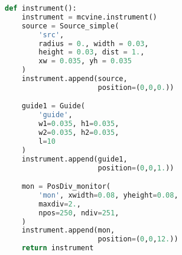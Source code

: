 \begin{lstlisting}[language=python]
def instrument():
    instrument = mcvine.instrument()
    source = Source_simple(
        'src',
        radius = 0., width = 0.03,
        height = 0.03, dist = 1.,
        xw = 0.035, yh = 0.035
    )
    instrument.append(source,
                      position=(0,0,0.))

    guide1 = Guide(
        'guide',
        w1=0.035, h1=0.035,
        w2=0.035, h2=0.035,
        l=10
    )
    instrument.append(guide1,
                      position=(0,0,1.))

    mon = PosDiv_monitor(
        'mon', xwidth=0.08, yheight=0.08,
        maxdiv=2.,
        npos=250, ndiv=251,
    )
    instrument.append(mon,
                      position=(0,0,12.))
    return instrument
\end{lstlisting}

